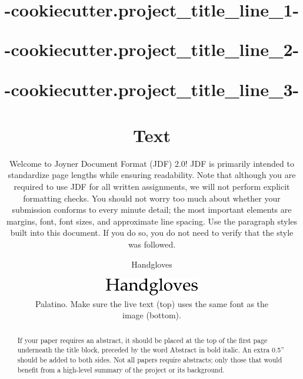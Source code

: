 

\title{
  {{-cookiecutter.project_title_line_1-}} \\

  {%
    {{-cookiecutter.project_title_line_2-}} \\
  {%

  {%
    {{-cookiecutter.project_title_line_3-}} \\
  {%
  }



\maketitle
\thispagestyle{fancy}

% 

\begin{abstract}
If your paper requires an abstract, it should be placed at the top of the first page underneath the title block, preceded by the word Abstract in bold italic. An extra 0.5'' should be added to both sides. Not all papers require abstracts; only those that would benefit from a high-level summary of the project or its background.
\end{abstract}

\section{Text}
Welcome to Joyner Document Format (JDF) 2.0! JDF is primarily intended to standardize page lengths while ensuring readability. Note that although you are required to use JDF for all written assignments, we will not perform explicit formatting checks. You should not worry too much about whether your submission conforms to every minute detail; the most important elements are margins, font, font sizes, and approximate line spacing. Use the paragraph styles built into this document. If you do so, you do not need to verify that the style was followed.

\huge\centerline{Handgloves}\normalsize

\begin{figure}[H]
  \centering
  \includegraphics[scale=0.7]{figs/example-image1}
  \caption{Palatino. Make sure the live text (top) uses the same font as the image (bottom).}
  \label{fig::1}
\end{figure}

}}}}
